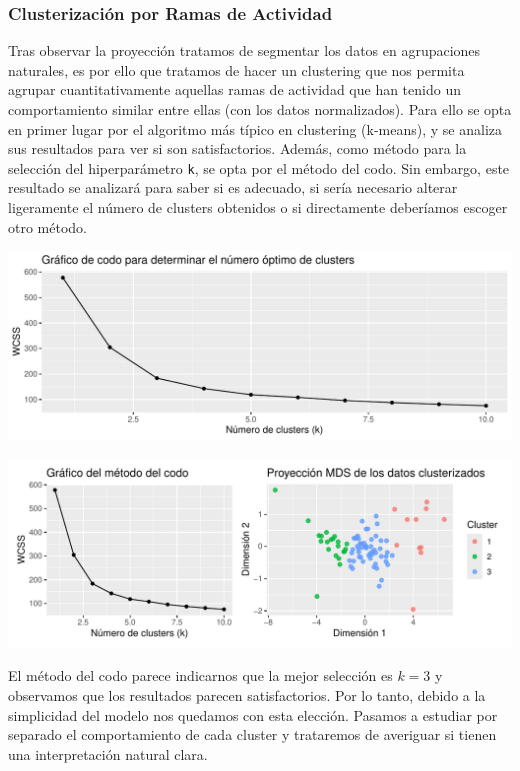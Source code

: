 \documentclass[notspecified,article,submit,moreauthors,pdftex]{Definitions/mdpi}
\begin{document}
\subsubsection{Clusterización por Ramas de
Actividad}\label{clusterizaciuxf3n-por-ramas-de-actividad}

Tras observar la proyección tratamos de segmentar los datos en
agrupaciones naturales, es por ello que tratamos de hacer un clustering
que nos permita agrupar cuantitativamente aquellas ramas de actividad
que han tenido un comportamiento similar entre ellas (con los datos
normalizados). Para ello se opta en primer lugar por el algoritmo más
típico en clustering (k-means), y se analiza sus resultados para ver si
son satisfactorios. Además, como método para la selección del
hiperparámetro \texttt{k}, se opta por el método del codo. Sin embargo,
este resultado se analizará para saber si es adecuado, si sería
necesario alterar ligeramente el número de clusters obtenidos o si
directamente deberíamos escoger otro método.

\includegraphics{ProyectoAED2024_files/figure-latex/unnamed-chunk-45-1.pdf}

\includegraphics{ProyectoAED2024_files/figure-latex/unnamed-chunk-46-1.pdf}

El método del codo parece indicarnos que la mejor selección es \(k=3\) y
observamos que los resultados parecen satisfactorios. Por lo tanto,
debido a la simplicidad del modelo nos quedamos con esta elección.
Pasamos a estudiar por separado el comportamiento de cada cluster y
trataremos de averiguar si tienen una interpretación natural clara.
\end{document}
